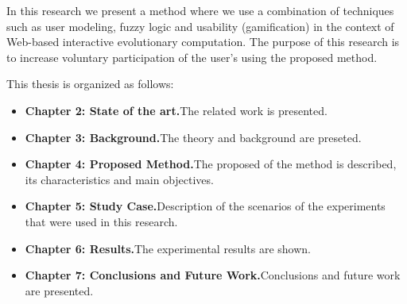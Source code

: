 \par In this research we present a method where we use a combination of techniques 
such as user modeling, fuzzy logic and usability (gamification) in the context 
of Web-based interactive evolutionary computation. The purpose of this research 
is to increase voluntary participation of the user's  using the proposed method.

This thesis is organized as follows:
\begin{itemize}
\item  \textbf{Chapter 2: State of the art.}{The related work is presented.}
\item  \textbf{Chapter 3: Background.}{The theory and background are preseted.} 
\item  \textbf{Chapter 4: Proposed Method.}{The proposed of the method is described, its characteristics and main objectives. } 
\item  \textbf{Chapter 5: Study Case.}{Description of the scenarios of the experiments that were used in this research.}
\item  \textbf{Chapter 6: Results.}{The experimental results are shown.}
\item  \textbf{Chapter 7: Conclusions and Future Work.}{Conclusions and future work are presented.}
\end{itemize}